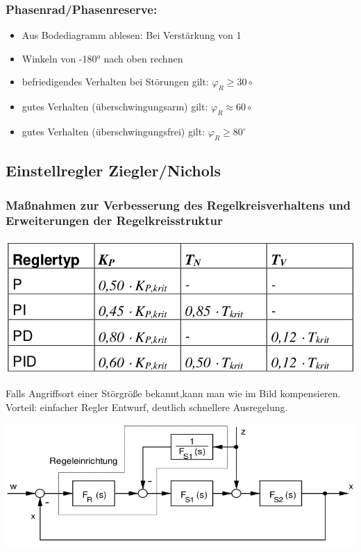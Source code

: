 \documentclass[10pt,a4paper]{article}
\begin{document}
\subsubsection{Phasenrad/Phasenreserve:}

\begin{itemize}[leftmargin=*]
    \item[] Aus Bodediagramm ablesen: Bei Verstärkung von 1
    \item[] Winkeln von -180° nach oben rechnen
    \item befriedigendes Verhalten bei Störungen gilt: $\varphi _R \geq 30\circ$
	\item gutes Verhalten (überschwingungsarm) gilt: $\varphi _R \approx  60\circ$
	\item gutes Verhalten (überschwingungsfrei) gilt: $\varphi _R \geq 80^\circ$
\end{itemize}

\subsection{Einstellregler Ziegler/Nichols}
\subsubsection{Maßnahmen zur Verbesserung des Regelkreisverhaltens und Erweiterungen der Regelkreisstruktur}

\centering
\includegraphics[width=0.9\columnwidth]{Figures/ZieglerNich.png}\\

\raggedright
\begin{mdframed}[style=exercise, frametitle=Störgrößenaufschaltung:]
	Falls Angriffsort einer Störgröße bekannt,kann man wie im Bild kompensieren.\\
	Vorteil: einfacher Regler Entwurf, deutlich schnellere Ausregelung.
\end{mdframed}

\includegraphics[width=0.9\columnwidth]{Figures/Stoergoesenschaltung.png}
\end{document}

